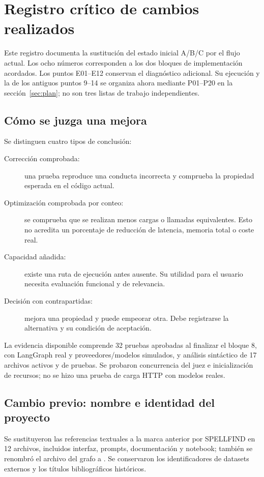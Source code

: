 \section{Registro crítico de cambios realizados}
\label{sec:evolucion}
Este registro documenta la sustitución del estado inicial A/B/C por el flujo
actual. Los ocho números corresponden a los dos bloques de implementación
acordados. Los puntos E01--E12 conservan el diagnóstico adicional. Su ejecución y la de
los antiguos puntos 9--14 se organiza ahora mediante P01--P20 en la
sección~\ref{sec:plan}; no son tres listas de trabajo independientes.

\subsection{Cómo se juzga una mejora}
Se distinguen cuatro tipos de conclusión:
\begin{description}
\item[Corrección comprobada:] una prueba reproduce una conducta incorrecta y
comprueba la propiedad esperada en el código actual.
\item[Optimización comprobada por conteo:] se comprueba que se realizan menos
cargas o llamadas equivalentes. Esto no acredita un porcentaje de reducción de
latencia, memoria total o coste real.
\item[Capacidad añadida:] existe una ruta de ejecución antes ausente. Su utilidad
para el usuario necesita evaluación funcional y de relevancia.
\item[Decisión con contrapartidas:] mejora una propiedad y puede empeorar otra.
Debe registrarse la alternativa y su condición de aceptación.
\end{description}
La evidencia disponible comprende 32 pruebas aprobadas al finalizar el bloque 8,
con LangGraph real y proveedores/modelos simulados, y análisis sintáctico de 17
archivos activos y de pruebas. Se probaron concurrencia del juez e inicialización
de recursos; no se hizo una prueba de carga HTTP con modelos reales.

\subsection{Cambio previo: nombre e identidad del proyecto}
Se sustituyeron las referencias textuales a la marca anterior por SPELLFIND en
12 archivos, incluidos interfaz, prompts, documentación y notebook; también se
renombró el archivo del grafo a . Se conservaron los
identificadores de datasets externos y los títulos bibliográficos históricos.

